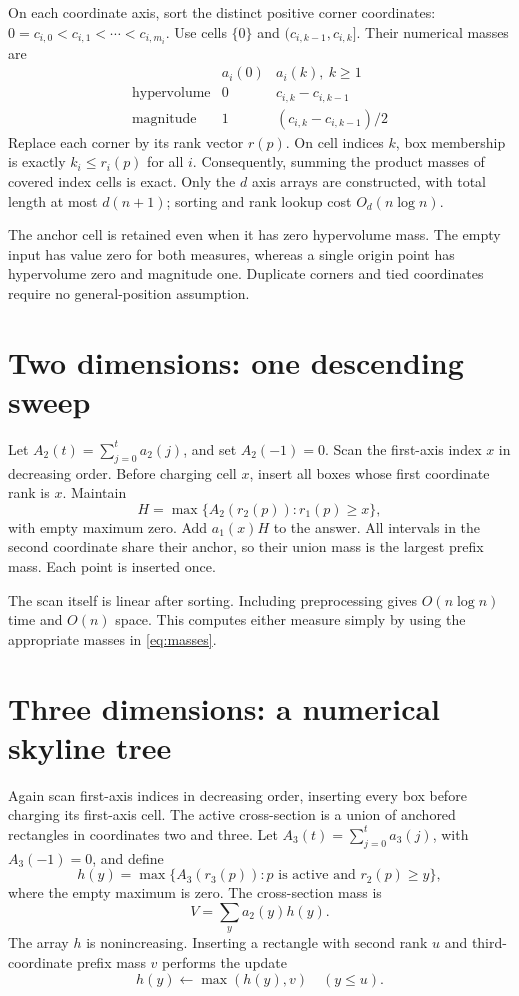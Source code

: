 \documentclass[12pt,a4paper]{article}
\newcommand{\1}{\mathbf1}
\begin{document}
On each coordinate axis, sort the distinct positive corner coordinates:
$0=c_{i,0}<c_{i,1}<\cdots<c_{i,m_i}$. Use cells $\{0\}$ and
$(c_{i,k-1},c_{i,k}]$. Their numerical masses are
\begin{equation}
\begin{array}{c|cc}
&a_i(0)&a_i(k),\ k\ge1\\\hline
\text{hypervolume}&0&c_{i,k}-c_{i,k-1}\\
\text{magnitude}&1&(c_{i,k}-c_{i,k-1})/2
\end{array}                                      \label{eq:masses}
\end{equation}
Replace each corner by its rank vector $r(p)$. On cell indices $k$,
box membership is exactly $k_i\le r_i(p)$ for all $i$.
Consequently, summing the product masses of covered index cells is exact.
Only the $d$ axis arrays are constructed, with total length at most
$d(n+1)$; sorting and rank lookup cost $O_d(n\log n)$.

The anchor cell is retained even when it has zero hypervolume mass.
The empty input has value zero for both measures, whereas a single
origin point has hypervolume zero and magnitude one. Duplicate corners
and tied coordinates require no general-position assumption.

\section{Two dimensions: one descending sweep}
Let $A_2(t)=\sum_{j=0}^t a_2(j)$, and set $A_2(-1)=0$.
Scan the first-axis index $x$ in decreasing order. Before charging cell
$x$, insert all boxes whose first coordinate rank is $x$.
Maintain
\[
H=\max\{A_2(r_2(p)):r_1(p)\ge x\},
\]
with empty maximum zero. Add $a_1(x)H$ to the answer.
All intervals in the second coordinate share their anchor, so their union
mass is the largest prefix mass. Each point is inserted once.

The scan itself is linear after sorting. Including preprocessing gives
$O(n\log n)$ time and $O(n)$ space. This computes either measure simply
by using the appropriate masses in \eqref{eq:masses}.

\section{Three dimensions: a numerical skyline tree}\label{sec:3d}
Again scan first-axis indices in decreasing order, inserting every box
before charging its first-axis cell. The active cross-section is a union
of anchored rectangles in coordinates two and three.
Let $A_3(t)=\sum_{j=0}^t a_3(j)$, with $A_3(-1)=0$, and define
\[
h(y)=\max\{A_3(r_3(p)): p\text{ is active and }r_2(p)\ge y\},
\]
where the empty maximum is zero. The cross-section mass is
\begin{equation}
                         V=\sum_y a_2(y)h(y).       \label{eq:skyline}
\end{equation}
The array $h$ is nonincreasing. Inserting a rectangle with second rank $u$
and third-coordinate prefix mass $v$ performs the update
\[
                         h(y)\gets\max(h(y),v)\quad(y\le u).
\]
\end{document}
